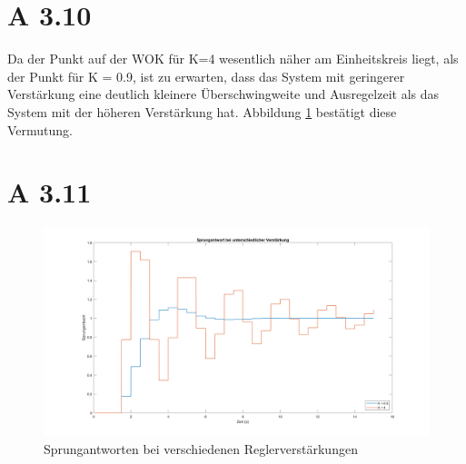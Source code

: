 \section*{A 3.10}

Da der Punkt auf der WOK für K=4 wesentlich näher am Einheitskreis liegt, als der Punkt für K = 0.9, ist zu erwarten, dass das System mit geringerer Verstärkung eine deutlich kleinere Überschwingweite und Ausregelzeit als das System mit der höheren Verstärkung hat. Abbildung \ref{sa} bestätigt diese Vermutung.
\newpage

\section*{A 3.11}

\begin{figure}[h]
	\centering
	\includegraphics[width=1\linewidth]{images/sprungantworten.png}
	\caption{Sprungantworten bei verschiedenen Reglerverstärkungen}
	\label{sa}
\end{figure}





























